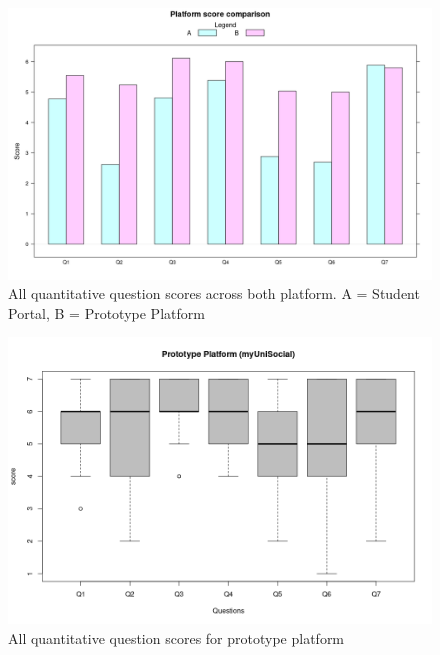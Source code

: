 \documentclass[lettersize,journal]{IEEEtran}
\begin{document}
		\begin{figure}[h!]
			\centerline{
				\includegraphics[width=\linewidth]{images/GroupedBarComparison.png}}
        		\caption{All quantitative question scores across both platform. A = Student Portal, B = Prototype Platform}
			\label{figure 4}
		\end{figure}

		\begin{figure}[h!]
        		\includegraphics[width=\linewidth]{images/PrototypeFull.png}
        		\caption{All quantitative question scores for prototype platform}
        		\label{figure 5}
		\end{figure}
\end{document}
